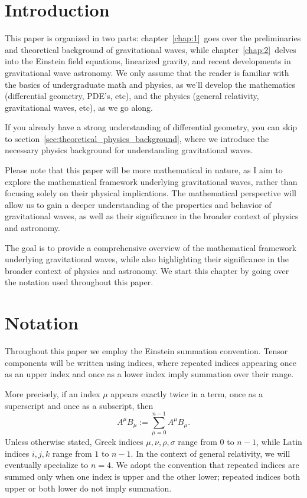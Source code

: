 \section{Introduction}
\label{sec:introduction}

\noindent
This paper is organized in two parts: chapter~\ref{chap:1}~goes over the preliminaries and theoretical background of gravitational waves, while chapter~\ref{chap:2}~delves into the Einstein field equations, linearized gravity, and recent developments in gravitational wave astronomy. We only assume that the reader is familiar with the basics of undergraduate math and physics, as we'll develop the mathematics (differential geometry, PDE's, etc), and the physics (general relativity, gravitational waves, etc), as we go along.

If you already have a strong understanding of differential geometry, you can skip to section~\ref{sec:theoretical_physics_background}, where we introduce the necessary physics background for understanding gravitational waves.

Please note that this paper will be more mathematical in nature, as I aim to explore the mathematical framework underlying gravitational waves, rather than focusing solely on their physical implications. The mathematical perspective will allow us to gain a deeper understanding of the properties and behavior of gravitational waves, as well as their significance in the broader context of physics and astronomy.

The goal is to provide a comprehensive overview of the mathematical framework underlying gravitational waves, while also highlighting their significance in the broader context of physics and astronomy. We start this chapter by going over the notation used throughout this paper.

\section{Notation}

Throughout this paper we employ the Einstein summation convention. Tensor components will be written using indices, where repeated indices appearing once as an upper index and once as a lower index imply summation over their range.

More precisely, if an index $\mu$ appears exactly twice in a term, once as a superscript and once as a subscript, then
\[%
  A^\mu B_\mu := \sum_{\mu=0}^{n-1} A^\mu B_\mu
.\]%
Unless otherwise stated, Greek indices $\mu, \nu, \rho, \sigma$ range from $0$ to $n-1$, while Latin indices $i, j, k$ range from $1$ to $n-1$. In the context of general relativity, we will eventually specialize to $n = 4$. We adopt the convention that repeated indices are summed only when one index is upper and the other lower; repeated indices both upper or both lower do not imply summation.

